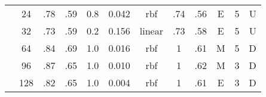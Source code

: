 \begin{table}
\begin{tabular}{|c|c|ccccc||ccccc|}
  &  24 &   .78 &  .59 & 0.8 &    0.042 &     rbf &   .74 &  .56 &      E & 5 &       U \\
  &  32 &   .73 &  .59 & 0.2 &    0.156 &  linear &   .73 &  .58 &      E & 5 &       U \\
  &  64 &   .84 &  .69 & 1.0 &    0.016 &     rbf &     1 &  .61 &      M & 5 &       D \\
  &  96 &   .87 &  .65 & 1.0 &    0.010 &     rbf &     1 &  .62 &      M & 3 &       D \\
  & 128 &   .82 &  .65 & 1.0 &    0.004 &     rbf &     1 &  .61 &      E & 3 &       D \\\hline
\end{tabular}
\end{table}
